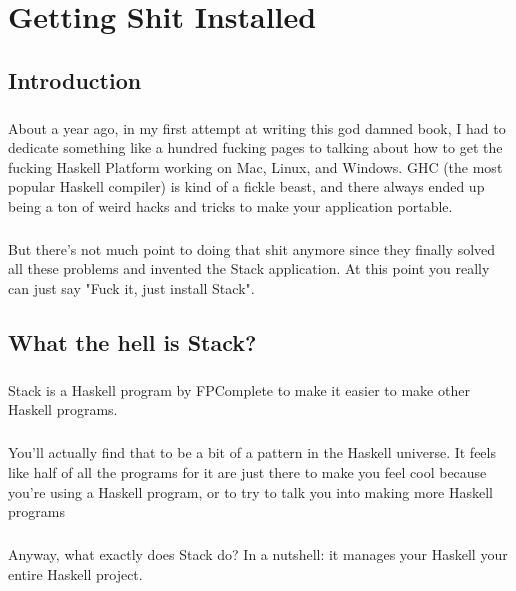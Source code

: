 \chapter{Getting Shit Installed}

\section{Introduction}
\paragraph{}
About a year ago, in my first attempt at writing this god damned book, I had to dedicate something like a hundred fucking pages to talking about how to get the fucking Haskell Platform working on Mac, Linux, and Windows. GHC (the most popular Haskell compiler) is kind of a fickle beast, and there always ended up being a ton of weird hacks and tricks to make your application portable. 


\paragraph{}
But there's not much point to doing that shit anymore since they finally solved all these problems and invented the Stack application.  At this point you really can just say "Fuck it, just install Stack". 

\section{What the hell is Stack?}

\paragraph{}
Stack is a Haskell program by FPComplete to make it easier to make other Haskell programs.  

\paragraph{}
You'll actually find that to be a bit of a pattern in the Haskell universe.  It feels like half of all the programs for it are just there to make you feel cool because you're using a Haskell program, or to try to talk you into making more Haskell programs

\paragraph{}
Anyway, what exactly does Stack do?  In a nutshell: it manages your Haskell your entire Haskell project.  

